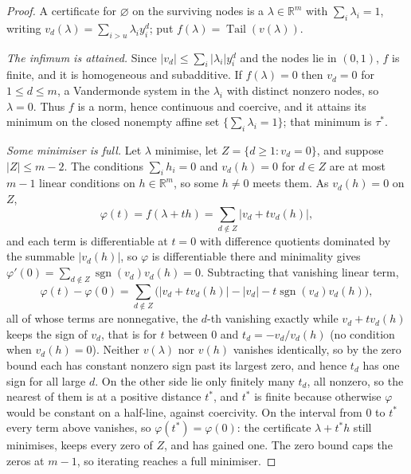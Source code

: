 \documentclass[11pt]{article}
\theoremstyle{definition}
\theoremstyle{plain}
\newcommand{\R}{\mathbb R}
\DeclareMathOperator{\Tail}{Tail}
\DeclareMathOperator{\sgn}{sgn}
\begin{document}
\begin{proof}
A certificate for $\varnothing$ on the surviving nodes is a
$\lambda\in\R^m$ with $\sum_i\lambda_i=1$, writing
$v_d(\lambda)=\sum_{i>u}\lambda_iy_i^d$; put $f(\lambda)=\Tail(v(\lambda))$.

\emph{The infimum is attained.}  Since $|v_d|\le\sum_i|\lambda_i|y_i^d$ and
the nodes lie in $(0,1)$, $f$ is finite, and it is homogeneous and
subadditive.  If $f(\lambda)=0$ then $v_d=0$ for $1\le d\le m$, a Vandermonde
system in the $\lambda_i$ with distinct nonzero nodes, so $\lambda=0$.  Thus
$f$ is a norm, hence continuous and coercive, and it attains its minimum on
the closed nonempty affine set $\{\sum_i\lambda_i=1\}$; that minimum is
$\tau^*$.

\emph{Some minimiser is full.}  Let $\lambda$ minimise, let
$Z=\{d\ge1:v_d=0\}$, and suppose $|Z|\le m-2$.  The conditions
$\sum_ih_i=0$ and $v_d(h)=0$ for $d\in Z$ are at most $m-1$ linear
conditions on $h\in\R^m$, so some $h\ne0$ meets them.  As $v_d(h)=0$ on $Z$,
\[
  \varphi(t)=f(\lambda+th)=\sum_{d\notin Z}\bigl|v_d+tv_d(h)\bigr|,
\]
and each term is differentiable at $t=0$ with difference quotients dominated
by the summable $|v_d(h)|$, so $\varphi$ is differentiable there and
minimality gives $\varphi'(0)=\sum_{d\notin Z}\sgn(v_d)v_d(h)=0$.
Subtracting that vanishing linear term,
\[
  \varphi(t)-\varphi(0)=\sum_{d\notin Z}
  \bigl(|v_d+tv_d(h)|-|v_d|-t\sgn(v_d)v_d(h)\bigr),
\]
all of whose terms are nonnegative, the $d$-th vanishing exactly while
$v_d+tv_d(h)$ keeps the sign of $v_d$, that is for $t$ between $0$ and
$t_d=-v_d/v_d(h)$ (no condition when $v_d(h)=0$).  Neither $v(\lambda)$ nor
$v(h)$ vanishes identically, so by the zero bound each has constant nonzero
sign past its largest zero, and hence $t_d$ has one sign for all large $d$.
On the other side lie only finitely many $t_d$, all nonzero, so the nearest
of them is at a positive distance $t^*$, and $t^*$ is finite because
otherwise $\varphi$ would be constant on a half-line, against coercivity.
On the interval from $0$ to $t^*$ every term above vanishes, so
$\varphi(t^*)=\varphi(0)$: the certificate $\lambda+t^*h$ still minimises,
keeps every zero of $Z$, and has gained one.  The zero bound caps the zeros
at $m-1$, so iterating reaches a full minimiser.


\end{proof}
\end{document}
